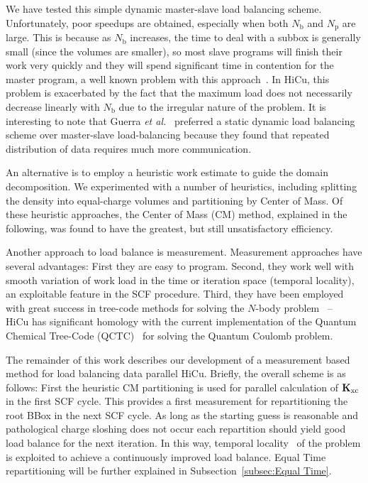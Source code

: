 \commentoutA{\documentclass[prl,aps,twocolumn,showpacs,twocolumngrid,superbib]{revtex4}}
\newcommand{\Kxc}{{\bf K}_{\mathrm{xc}}}
\newcommand{\Np}{N_{\mathrm{p}}} \newcommand{\Nbox}{N_{\mathrm{b}}}
\begin{document}
We have tested this simple dynamic master-slave load balancing
scheme. Unfortunately, poor speedups are obtained, especially when
both $\Nbox$ and $\Np$ are large.  This is because as $\Nbox$
increases, the time to deal with a subbox is generally small (since
the volumes are smaller), so most slave programs will finish their
work very quickly and they will spend significant time in contention for the
master program, a well known problem with this
approach~\cite{BWilkinson99,GWilson95}.  In HiCu, this problem is exacerbated by
the fact that the maximum load does not necessarily decrease linearly
with $\Nbox$ due to the irregular nature of the problem.  It is
interesting to note that Guerra {\it et al.}\/~\cite{Guerra_95}
preferred a static dynamic load balancing scheme over master-slave
load-balancing because they found that repeated distribution of data
requires much more communication.

An alternative is to employ a heuristic work estimate to guide the
domain decomposition.  We experimented with a number of heuristics,
including splitting the density into equal-charge volumes and
partitioning by Center of Mass.  Of these heuristic approaches, the
Center of Mass (CM) method, explained in the following, was
found to have the greatest, but still unsatisfactory efficiency.

Another approach to load balance is measurement.
Measurement approaches have several advantages: First they are easy
to program.  Second, they work well with smooth variation of work load in
the time or iteration space (temporal locality), an exploitable
feature in the SCF procedure.  Third, they have been employed with
great success in tree-code methods for solving the $N$-body problem
\cite{JPilkington96,warren:92_article,Grama94_article,Warren95b,Singh93,Singh_95v27,Grama_98v24} ~--~
HiCu has significant homology with the current implementation of the
Quantum Chemical Tree-Code (QCTC)~\cite{MChallacombe96,MChallacombe96B,MChallacombe97} for
solving the Quantum Coulomb problem.

The remainder of this work describes our development of a measurement
based method for load balancing data parallel HiCu.  Briefly, the
overall scheme is as follows: First the heuristic CM partitioning is
used for parallel calculation of $\Kxc$ in the first SCF cycle.  This
provides a first measurement for repartitioning the root BBox in the
next SCF cycle.  As long as the starting guess is reasonable and
pathological charge sloshing does not occur each repartition should
yield good load balance for the next iteration. In this way, temporal
locality~\cite{JPilkington96} of the problem is exploited to achieve
a continuously improved load balance. Equal Time repartitioning
will be further explained in Subsection~\ref{subsec:Equal Time}.
\end{document}
